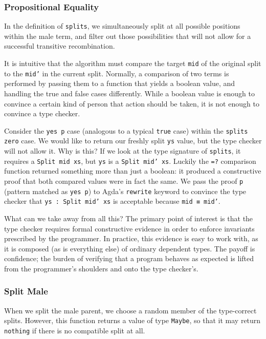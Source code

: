 \documentclass[runningheads,a4paper]{llncs}
\begin{document}
\subsubsection{Propositional Equality}

In the definition of \texttt{splits}, we simultaneously split at all
possible positions within the male term, and filter out those possibilities that
will not allow for a successful transitive recombination.

It is intuitive that the algorithm must compare the target \texttt{mid}
of the original split to the \texttt{mid'} in the current
split. Normally, a comparison of two terms is performed by passing them
to a function that yields a boolean value, and handling the true and false
cases differently. While a boolean value is enough to convince a certain 
kind of person that action should be taken, it is not enough to convince a type checker.

Consider the \texttt{yes p} case (analogous to a typical \texttt{true}
case) within the \texttt{splits zero} case. We would like to return
our freshly split \texttt{ys} value, but the type checker will not allow
it. Why is this? If we look at the type signature of \texttt{splits}, it
requires a \texttt{Split mid xs}, but \texttt{ys} is a \texttt{Split mid'
  xs}. Luckily the \texttt{=?} comparison function returned something
more than just a boolean: it produced a constructive proof that both compared
values were in fact the same. We pass the proof \texttt{p} (pattern
matched as \texttt{yes p}) to Agda's \texttt{rewrite} keyword to
convince the type checker that \texttt{ys : Split mid' xs} is acceptable
because \texttt{mid ≡ mid'}.

What can we take away from all this? The primary point of interest is that
the type checker requires formal constructive evidence in order to enforce
invariants prescribed by the programmer. In practice, this evidence is easy to work
with, as it is composed (as is everything else) of ordinary dependent types.
The payoff is confidence; the burden of verifying that a program behaves as expected
is lifted from the programmer's shoulders and onto the type checker's.

\subsubsection{Split Male}

When we split the male parent, we choose a random member of the
type-correct splits. However, this function returns a value of type
\texttt{Maybe}, so that it may return \texttt{nothing} if there is no
compatible split at all.
\end{document}

